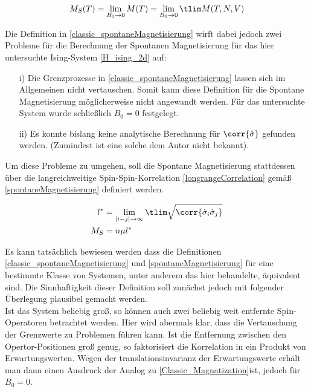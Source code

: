 \begin{equation} \label{classic_spontaneMagnetisierung}
M_S(T) = \lim_{B_0 \rightarrow 0} M(T) = \lim_{B_0 \rightarrow 0} \tlim M(T,N,V)
\end{equation}

\noindent Die Definition in \eqref{classic_spontaneMagnetisierung} wirft dabei jedoch zwei Probleme für die Berechnung der Spontanen  Magnetisierung für das hier untersuchte Ising-System \eqref{H_ising_2d} auf:

\begin{itemize}
\item [i)] Die Grenzprozesse in \eqref{classic_spontaneMagnetisierung} lassen sich im Allgemeinen nicht vertauschen. Somit kann diese Definition für die Spontane Magnetisierung möglicherweise nicht angewandt werden. Für das untersuchte System wurde schließlich $B_0 = 0$ festgelegt. 
\item [ii)] Es konnte bislang keine analytische Berechnung für $\corr{\hat{\sigma}}$ gefunden werden. (Zumindest ist eine solche dem Autor nicht bekannt). 
\end{itemize}

\noindent Um diese Probleme zu umgehen, soll die Spontane Magnetisierung stattdessen über die langreichweitige Spin-Spin-Korrelation \eqref{longrangeCorrelation} gemäß \eqref{spontaneMagnetisierung} definiert werden. 

\begin{grayframe}[frametitle = {Spontane Magnetisierung}]
\begin{align}
l^* & = \lim_{|i-j| \rightarrow \infty} \tlim \sqrt{\corr{\hat{\sigma}_i\hat{\sigma}_j}} \label{longrangeCorrelation}\\ 
M_S   & = n \mu l^* \label{spontaneMagnetisierung}
\end{align}
\end{grayframe}

\noindent Es kann tatsächlich bewiesen werden dass die Definitionen \eqref{classic_spontaneMagnetisierung} und \eqref{spontaneMagnetisierung} für eine bestimmte Klasse von Systemen, unter anderem das hier behandelte, äquivalent sind. Die Sinnhaftigkeit dieser Definition soll zunächst jedoch mit folgender Überlegung plausibel gemacht werden.\\
Ist das System beliebig groß, so können auch zwei beliebig weit entfernte Spin-Operatoren betrachtet werden. Hier wird abermals klar, dass die Vertauschung der Grenzwerte zu Problemen führen kann. Ist die Entfernung zwischen den Opertor-Positionen groß genug, so faktorisiert die Korrelation in ein Produkt von Erwartungswerten. Wegen der translationsinvarianz der Erwartungswerte erhält man dann einen Ausdruck der Analog zu \eqref{Classic_Magnatization}ist, jedoch für $B_0 = 0$.

